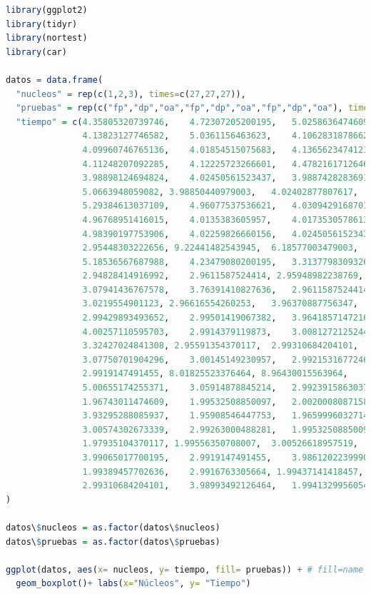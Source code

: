 \documentclass{article}
\begin{document}
\vspace{5mm}
\begin{lstlisting}[language=R]
library(ggplot2)
library(tidyr)
library(nortest)
library(car)

datos = data.frame(
  "nucleos" = rep(c(1,2,3), times=c(27,27,27)),
  "pruebas" = rep(c("fp","dp","oa","fp","dp","oa","fp","dp","oa"), times=c(9,9,9,9,9,9,9,9,9)),
  "tiempo" = c(4.35805320739746,	4.72307205200195,	5.02586364746093,
               4.13823127746582,	5.0361156463623,	4.10628318786621,
               4.09960746765136,	4.01854515075683,	4.1365623474121, 
               4.11248207092285,	4.12225723266601,	4.47821617126464,	
               3.98898124694824,	4.02450561523437,	3.98874282836914,	
               5.0663948059082,	3.98850440979003,	4.02402877807617,	
               5.29384613037109,	4.96077537536621,	4.03094291687011, 
               4.96768951416015,	4.0135383605957,	4.01735305786132,	
               4.98390197753906,	4.02259826660156,	4.02450561523437,	
               2.95448303222656, 9.22441482543945,	6.18577003479003,	
               5.18536567687988,	4.23479080200195,	3.31377983093261,	
               2.94828414916992,	2.9611587524414, 2.95948982238769,	
               3.07941436767578,	3.76391410827636,	2.9611587524414,	
               3.0219554901123,	2.96616554260253,	3.96370887756347, 
               2.99429893493652,	2.99501419067382,	3.96418571472167,	
               4.00257110595703,	2.9914379119873,	3.00812721252441,	
               3.32427024841308, 2.95591354370117,	2.99310684204101,	
               3.07750701904296,	3.00145149230957,	2.9921531677246,	
               2.9919147491455,	8.01825523376464, 8.96430015563964,	
               5.00655174255371,	3.05914878845214,	2.99239158630371,	
               1.96743011474609,	1.99532508850097,	2.00200080871582, 
               3.93295288085937,	1.95908546447753,	1.96599960327148,	
               3.00574302673339,	2.99263000488281,	1.99532508850097,	
               1.97935104370117, 1.99556350708007,	3.00526618957519,	
               3.99065017700195,	2.9919147491455,	3.98612022399902,	
               1.99389457702636,	2.9916763305664, 1.99437141418457,	
               2.99310684204101,	3.98993492126464,	1.99413299560546)
)

datos\$nucleos = as.factor(datos\$nucleos)
datos\$pruebas = as.factor(datos\$pruebas)

ggplot(datos, aes(x= nucleos, y= tiempo, fill= pruebas)) + # fill=name allow to automatically dedicate a color for each group
  geom_boxplot()+ labs(x="Núcleos", y= "Tiempo")


\end{lstlisting}
\end{document}
